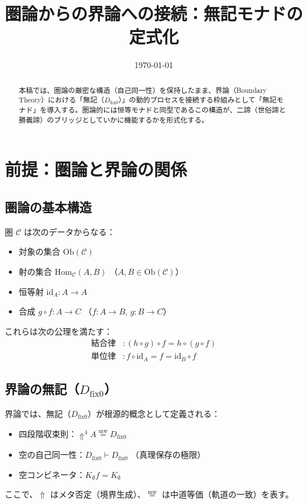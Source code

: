 \documentclass[11pt,a4paper]{article}
\theoremstyle{definition}
\newcommand{\mweq}{\mathrel{\overset{\mathrm{mw}}{=}}}
\newcommand{\dfix}{D_{\mathrm{fix}0}} %
\newcommand{\metanegation}{\Uparrow}     %
\begin{document}
\title{圏論からの界論への接続：無記モナドの定式化}
\author{}
\date{\today}
\maketitle

\begin{abstract}
本稿では、圏論の厳密な構造（自己同一性）を保持したまま、界論（Boundary Theory）における「無記（$\dfix$）」の動的プロセスを接続する枠組みとして「無記モナド」を導入する。圏論的には恒等モナドと同型であるこの構造が、二諦（世俗諦と勝義諦）のブリッジとしていかに機能するかを形式化する。
\end{abstract}

\section{前提：圏論と界論の関係}

\subsection{圏論の基本構造}
圏 $\mathcal{C}$ は次のデータからなる：
\begin{itemize}
    \item 対象の集合 $\mathrm{Ob}(\mathcal{C})$
    \item 射の集合 $\mathrm{Hom}_{\mathcal{C}}(A,B)$ （$A,B \in \mathrm{Ob}(\mathcal{C})$）
    \item 恒等射 $\mathrm{id}_A : A \to A$
    \item 合成 $g \circ f : A \to C$ （$f : A \to B$, $g : B \to C$）
\end{itemize}
これらは次の公理を満たす：
\begin{align}
    \text{結合律} &: (h \circ g) \circ f = h \circ (g \circ f) \\
    \text{単位律} &: f \circ \mathrm{id}_A = f = \mathrm{id}_B \circ f
\end{align}

\subsection{界論の無記（$\dfix$）}
界論では、無記（$\dfix$）が根源的概念として定義される：
\begin{itemize}
    \item 四段階収束則：$\metanegation^4 A \mweq \dfix$
    \item 空の自己同一性：$\dfix \vdash \dfix$ （真理保存の極限）
    \item 空コンビネータ：$K_\emptyset f = K_\emptyset$
\end{itemize}
ここで、$\metanegation$ はメタ否定（境界生成）、$\mweq$ は中道等価（軌道の一致）を表す。
\end{document}
